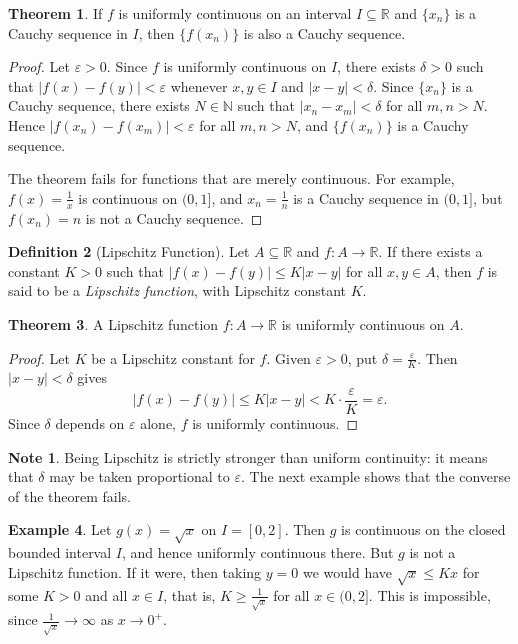 \documentclass[11pt,a4paper]{article}
\numberwithin{equation}{section}
\theoremstyle{definition}
\newtheorem{thm}{Theorem}[subsection]
\newtheorem{defn}[thm]{Definition}
\newtheorem{exa}[thm]{Example}
\newtheorem*{note}{Note}
\begin{document}
\begin{thm}
If $f$ is uniformly continuous on an interval $I\subseteq\mathbb{R}$ and $\{x_n\}$ is a Cauchy sequence in $I$, then $\{f(x_n)\}$ is also a Cauchy sequence.
\end{thm}

\begin{proof}
Let $\varepsilon > 0$. Since $f$ is uniformly continuous on $I$, there exists $\delta > 0$ such that $|f(x) - f(y)|  < \varepsilon$ whenever $x, y\in I$ and $|x - y| < \delta$. Since $\{x_n\}$ is a Cauchy sequence, there exists $N\in \mathbb{N}$ such that $|x_n - x_m| < \delta$ for all $m, n > N$. Hence $|f(x_n) - f(x_m)| < \varepsilon$ for all $m, n> N$, and $\{f(x_n)\}$ is a Cauchy sequence.

The theorem fails for functions that are merely continuous. For example, $f(x) = \frac{1}{x}$ is continuous on $(0,1]$, and $x_n = \frac{1}{n}$ is a Cauchy sequence in $(0,1]$, but $f(x_n) = n$ is not a Cauchy sequence.
\end{proof}


\begin{defn}[Lipschitz Function]
Let $A\subseteq \mathbb{R}$ and $f: A\longrightarrow \mathbb{R}$. If there exists a constant $K>0$ such that $|f(x) - f(y)|\leq K |x - y|$ for all $x, y\in A$, then $f$ is said to be a \emph{Lipschitz function}, with Lipschitz constant $K$.
\end{defn}


\begin{thm}
A Lipschitz function $f: A\longrightarrow \mathbb{R}$ is uniformly continuous on $A$.
\end{thm}

\begin{proof}
Let $K$ be a Lipschitz constant for $f$. Given $\varepsilon>0$, put $\delta = \frac{\varepsilon}{K}$. Then $|x-y|<\delta$ gives
$$|f(x)-f(y)| \leq K|x-y| < K\cdot\frac{\varepsilon}{K} = \varepsilon .$$
Since $\delta$ depends on $\varepsilon$ alone, $f$ is uniformly continuous.
\end{proof}

\begin{note}
Being Lipschitz is strictly stronger than uniform continuity: it means that $\delta$ may be taken proportional to $\varepsilon$. The next example shows that the converse of the theorem fails.
\end{note}


\begin{exa}
Let $g(x) = \sqrt{x}$ on $I=[0,2]$. Then $g$ is continuous on the closed bounded interval $I$, and hence uniformly continuous there. But $g$ is not a Lipschitz function. If it were, then taking $y = 0$ we would have $\sqrt{x}\leq K x$ for some $K>0$ and all $x\in I$, that is, $K\geq \frac{1}{\sqrt{x}}$ for all $x\in(0,2]$. This is impossible, since $\frac{1}{\sqrt{x}}\longrightarrow\infty$ as $x\longrightarrow 0^+$.
\end{exa}
\end{document}
